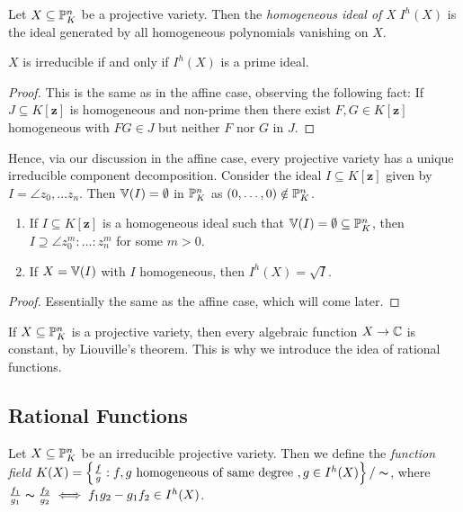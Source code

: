 \documentclass[10pt,a4paper,rgb]{article}
\begin{document}
Let $X \subseteq \P_K^n$ be a projective variety. Then the \emph{homogeneous ideal of X} $I^h(X)$ is the ideal generated by all homogeneous polynomials vanishing on $X$.

\begin{lemma}
$X$ is irreducible if and only if $I^h(X)$ is a prime ideal.
\end{lemma}
\begin{proof}
This is the same as in the affine case, observing the following fact: If $J \subseteq K[\mathbf{z}]$ is homogeneous and non-prime then there exist $F, G \in K[\mathbf{z}]$ homogeneous with $FG \in J$ but neither $F$ nor $G$ in $J$.
\end{proof}
Hence, via our discussion in the affine case, every projective variety has a unique irreducible component decomposition. Consider the ideal $I \subseteq K[\mathbf{z}]$ given by $I = \angle{z_0, \ldots z_n}$. Then $\V(I) = \emptyset$ in $\P_K^n$ as $(0,\ldots, 0) \notin \P^n_K$.

\begin{theorem}
\item
\begin{enumerate}
\item If $I \subseteq K[\mathbf{z}]$ is a homogeneous ideal such that $\V(I) = \emptyset \subseteq \P^n_K$, then $I \supseteq \angle{z_0^m: \ldots: z_n^m}$ for some $m > 0$.

\item If $X = \V(I)$ with $I$ homogeneous, then $I^h(X) = \sqrt{I}$.
\end{enumerate}
\end{theorem}
\begin{proof}
Essentially the same as the affine case, which will come later.
\end{proof}

If $X \subseteq \P^n_K$ is a projective variety, then every algebraic function $X \to \C$ is constant, by Liouville's theorem. This is why we introduce the idea of rational functions.

\subsection{Rational Functions}
Let $X \subseteq \P_K^n$ be an irreducible projective variety. Then we define the \emph{function field} $K(X)  = \left\{\frac{f}{g} : f,g\text{ homogeneous of same degree }, g \in I^h (X)\right\} / \thicksim$, where $\frac{f_1}{g_1} \thicksim \frac{f_2}{g_2} \iff f_1g_2-g_1f_2 \in I^h(X)$.
\end{document}
